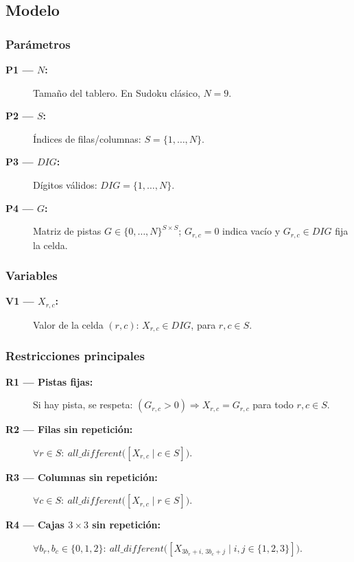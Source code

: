 
\subsection{Modelo}\label{sec:01-sudoku-modelo}

\subsubsection*{Parámetros}
\begin{description}
  \item[\textbf{P1 — \(N\):}] Tamaño del tablero. En Sudoku clásico, \(N=9\).
  \item[\textbf{P2 — \(S\):}] Índices de filas/columnas: \(S=\{1,\dots,N\}\).
  \item[\textbf{P3 — \(DIG\):}] Dígitos válidos: \(DIG=\{1,\dots,N\}\).
  \item[\textbf{P4 — \(G\):}] Matriz de pistas \(G\in\{0,\dots,N\}^{S\times S}\); \(G_{r,c}=0\) indica vacío y \(G_{r,c}\in DIG\) fija la celda.
\end{description}

\subsubsection*{Variables}
\begin{description}
  \item[\textbf{V1 — \(X_{r,c}\):}] Valor de la celda \((r,c)\): \(X_{r,c}\in DIG\), para \(r,c\in S\).
\end{description}

\subsubsection*{Restricciones principales}
\begin{description}
  \item[\textbf{R1 — Pistas fijas:}] Si hay pista, se respeta: \((G_{r,c}>0)\Rightarrow X_{r,c}=G_{r,c}\) para todo \(r,c\in S\).
  \item[\textbf{R2 — Filas sin repetición:}] \(\forall r\in S:\ \textit{all\_different}\big([X_{r,c}\mid c\in S]\big)\).
  \item[\textbf{R3 — Columnas sin repetición:}] \(\forall c\in S:\ \textit{all\_different}\big([X_{r,c}\mid r\in S]\big)\).
  \item[\textbf{R4 — Cajas \(3\times3\) sin repetición:}] \(\forall b_r,b_c\in\{0,1,2\}:\ \textit{all\_different}\big([X_{3b_r+i,\,3b_c+j}\mid i,j\in\{1,2,3\}]\big)\).
\end{description}

